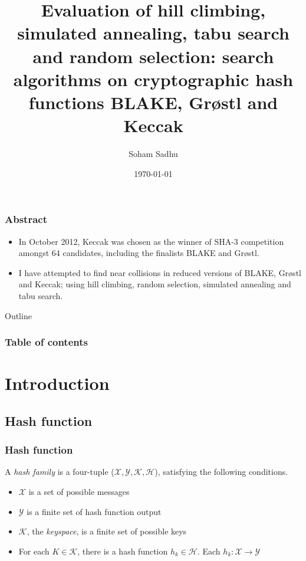 \documentclass{beamer}
\begin{document}
\title{Evaluation of hill climbing, simulated annealing, tabu search and random selection: search algorithms
       on cryptographic hash functions BLAKE, Gr{\o}stl and Keccak}  
\author{Soham Sadhu}
\date{\today} 

\begin{frame}
\titlepage
\end{frame}

\begin{frame}
\frametitle{Abstract}
\begin{itemize}
\item In October 2012, Keccak was chosen as the winner of SHA-3 competition amongst 64 candidates, including 
the finalists BLAKE and Gr{\o}stl.
\item I have attempted to find near collisions in reduced versions of BLAKE, Gr{\o}stl and Keccak; using hill
climbing, random selection, simulated annealing and tabu search.
\end{itemize}
\end{frame}

\begin{frame}[allowframebreaks]{Outline}
\frametitle{Table of contents}
\tableofcontents
\end{frame} 

\section{Introduction}

\subsection{Hash function}
\begin{frame}
  \frametitle{Hash function}
  A \emph{hash family} is a four-tuple ($\mathcal{X}, \mathcal{Y}, \mathcal{K}, \mathcal{H}$),
  satisfying the following conditions.\footnotemark
  \begin{itemize}
    \item $\mathcal{X}$ is a set of possible messages
    \item $\mathcal{Y}$ is a finite set of hash function output
    \item $\mathcal{K}$, the \emph{keyspace}, is a finite set of possible keys
    \item For each $K \in \mathcal{K}$, there is a hash function $h_{k} \in \mathcal{H}$. Each 
      $h_{k}: \mathcal{X} \to \mathcal{Y}$ 
  \end{itemize}
\end{frame}
\end{document}
